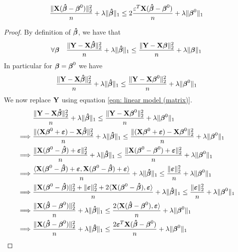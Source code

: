 \begin{lemma}
    $$\frac{\| \X (\btahat-\bta^{0})\|_{2}^{2}}{n} + \lambda\|\btahat\|_{1} \leq 2 \frac{\varepsilon^{T} \X (\btahat-\bta^{0})}{n}+\lambda \| \bta^{0} \|_{1}$$
\end{lemma}
\begin{proof}
    By definition of $\btahat$, we have that
    $$
        \forall \bta \quad \frac{\| \Y-\X \btahat \|_{2}^{2}}{n} + \lambda \| \btahat \|_{1} \leq \frac{\|\Y-\X \bta \|_{2}^{2}}{n}+\lambda \| \bta \|_{1}
    $$
    In particular for $\bta = \bta^0$ we have
    $$
        \frac{\| \Y-\X \btahat \|_{2}^{2}}{n}+\lambda\| \btahat \|_{1} \leq \frac{ \| \Y-\X \bta^0\|_{2}^{2}}{n}+\lambda \| \bta^0\|_{1}
    $$
    We now replace $\Y$ using equation \eqref{eqn: linear model (matrix)}.
    \begin{align*}
                 & \frac{\|\Y  - \X \btahat \|_{2}^{2}}{n} + \lambda \| \btahat\|_{1} \leq \frac{\| \Y  - \X \bta^0 \|_2^2}{n}+\lambda\|\bta^{0}\|_{1}                                                     \\
        \implies &
        \frac{\| (\X \bta^0 + \eps) - \X \btahat \|_{2}^{2}}{n}+\lambda\| \btahat \|_{1} \leq \frac{ \| (\X \bta^0 + \eps)-\X \bta^0\|_{2}^{2}}{n}+\lambda \| \bta^0\|_{1}                                 \\
        \implies &
        \frac{\| \X ( \bta^0 - \btahat) + \eps \|_{2}^{2}}{n} + \lambda\| \btahat \|_{1} \leq \frac{ \| \X ( \bta^0 - \bta^0) + \eps \|_{2}^{2}}{n}+\lambda \| \bta^0\|_{1}                                \\
        \implies &
        \frac{\langle \X ( \bta^0 - \btahat) + \eps, \X ( \bta^0 - \btahat) + \eps \rangle}{n}+\lambda \| \btahat \|_{1} \leq \frac{ \| \eps \|_{2}^{2}}{n}+\lambda \| \bta^0\|_{1}                        \\
        \implies &
        \frac{\| \X (\bta^0 - \btahat) \| _2^2 + \| \eps \|_2^2 + 2 \langle \X ( \bta^0 - \btahat),  \eps \rangle}{n}+\lambda \| \btahat \|_{1} \leq \frac{ \| \eps \|_{2}^{2}}{n}+\lambda \| \bta^0\|_{1} \\
        \implies &
        \frac{\| \X (\btahat - \bta^0) \| _2^2}{n} + \lambda \| \btahat \|_{1} \leq \frac{2 \langle \X ( \btahat - \bta^0),  \eps \rangle}{n} + \lambda \| \bta^0\|_{1}                                    \\
        \implies &
        \frac{\| \X (\btahat - \bta^0) \| _2^2}{n} + \lambda \| \btahat \|_{1} \leq \frac{2 \eps^T \X ( \btahat - \bta^0)}{n} + \lambda \| \bta^0\|_{1}                                                    \\
    \end{align*}
\end{proof}


